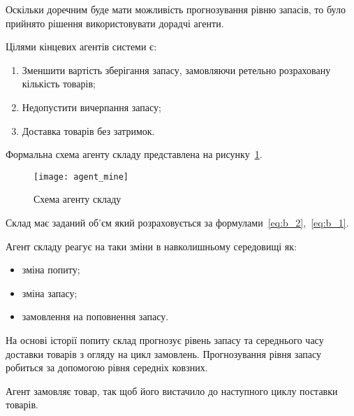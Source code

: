 Оскільки доречним буде мати можливість прогнозування рівню запасів, то було прийнято рішення використовувати дорадчі агенти.

Цілями кінцевих агентів системи є:
\begin{enumerate}
	\item Зменшити вартість зберігання запасу, замовляючи ретельно розраховану кількість товарів;
	\item Недопустити вичерпання запасу;
	\item Доставка товарів без затримок.
\end{enumerate}

Формальна схема агенту складу представлена на рисунку~\ref{fig:agent_mine}.

\begin{figure}[H]
	\centering
	\texttt{[image: agent\_mine]}
	\caption{Схема агенту складу}
	\label{fig:agent_mine}
\end{figure}

Склад має заданий об'єм який розраховується за формулами~\eqref{eq:b_2},~\eqref{eq:b_1}.

Агент складу реагує на таки зміни в навколишньому середовищі як:
\begin{itemize}
	\item зміна попиту;
	\item зміна запасу;
	\item замовлення на поповнення запасу.
\end{itemize} 

На основі історії попиту склад прогнозує рівень запасу та середнього часу доставки товарів з огляду на цикл замовлень. Прогнозування рівня запасу робиться за допомогою рівня середніх ковзних.

Агент замовляє товар, так щоб його вистачило до наступного циклу поставки товарів. 
